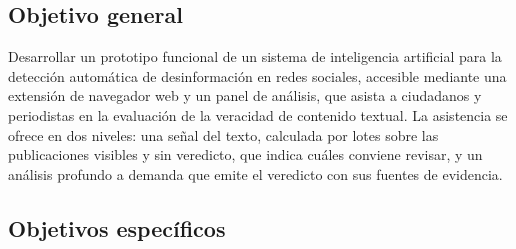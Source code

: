 \subsection{Objetivo general}

Desarrollar un prototipo funcional de un sistema de inteligencia artificial para la detección automática de desinformación en redes sociales, accesible mediante una extensión de navegador web y un panel de análisis, que asista a ciudadanos y periodistas en la evaluación de la veracidad de contenido textual. La asistencia se ofrece en dos niveles: una señal del texto, calculada por lotes sobre las publicaciones visibles y sin veredicto, que indica cuáles conviene revisar, y un análisis profundo a demanda que emite el veredicto con sus fuentes de evidencia.

\subsection{Objetivos específicos}

